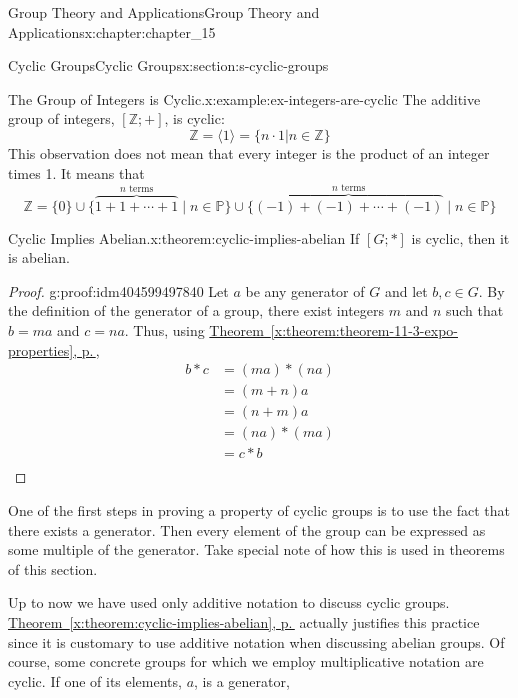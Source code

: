 \documentclass[twoside,10pt,]{book}
\newcommand{\xreffont}{\relax}
\numberwithin{equation}{section}
\begin{document}
\begin{chapterptx}{Group Theory and Applications}{}{Group Theory and Applications}{}{}{x:chapter:chapter_15}
\begin{sectionptx}{Cyclic Groups}{}{Cyclic Groups}{}{}{x:section:s-cyclic-groups}
\begin{example}{The Group of Integers is Cyclic.}{x:example:ex-integers-are-cyclic}
The additive group of integers, \([\mathbb{Z}; +]\), is cyclic:%
\begin{equation*}
\mathbb{Z} = \langle 1 \rangle = \{n\cdot 1 |n \in  \mathbb{Z}\}
\end{equation*}
This observation does not mean that every integer is the product of an integer times 1. It means that%
\begin{equation*}
\mathbb{Z} = \{0\}
\cup \{\overbrace{1+1+\cdots +1}^{n \textrm{ terms}} \mid  n \in \mathbb{P} \}
\cup \{\overbrace{(-1)+(-1)+\cdots +(-1)}^{n \textrm{ terms}} \mid n \in \mathbb{P}\}
\end{equation*}
%
\end{example}
\begin{theorem}{Cyclic Implies Abelian.}{}{x:theorem:cyclic-implies-abelian}%
If \([G;*]\) is cyclic, then it is abelian.%
\end{theorem}
\begin{proof}{}{g:proof:idm404599497840}
Let \(a\) be any generator of \(G\) and let \(b, c \in  G\). By the definition of the generator of a group, there exist integers \(m\) and \(n\) such that \(b = m a\) and \(c = n a\). Thus, using  \hyperref[x:theorem:theorem-11-3-expo-properties]{Theorem~{\xreffont\ref{x:theorem:theorem-11-3-expo-properties}}, p.\,\pageref{x:theorem:theorem-11-3-expo-properties}},%
\begin{equation*}
\begin{split}
b*c &= (m a)*(n a)\\
&= (m + n)a \\
&= (n + m)a \\
&= (n a)*(m a)\\
&=  c*b\\
\end{split}
\end{equation*}
%
\par
%
\end{proof}
One of the first steps in proving a property of cyclic groups is to use the fact that there exists a generator. Then every element of the group can be expressed as some multiple of the generator. Take special note of how this is used in theorems of this section.%
\par
Up to now we have used only additive notation to discuss cyclic groups. \hyperref[x:theorem:cyclic-implies-abelian]{Theorem~{\xreffont\ref{x:theorem:cyclic-implies-abelian}}, p.\,\pageref{x:theorem:cyclic-implies-abelian}} actually justifies this practice since it is customary to use additive notation when discussing abelian groups. Of course, some concrete groups for which we employ multiplicative notation are cyclic. If one of its elements, \(a\), is a generator,%

\end{sectionptx}
\end{chapterptx}
\end{document}
